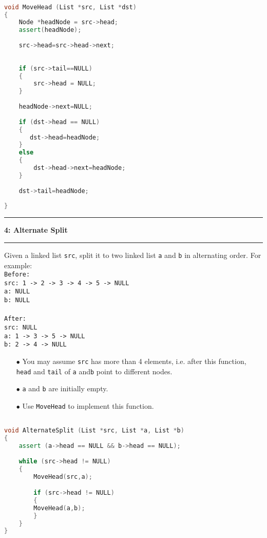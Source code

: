 \documentclass[10.5pt]{article}
\newcommand\question[2]{\vspace{.25in}\hrule\textbf{#1: #2}\vspace{.5em}\hrule\vspace{.10in}}
\begin{document}
\hrulefill
\begin{lstlisting}[language=C++]

void MoveHead (List *src, List *dst)
{
    Node *headNode = src->head;
    assert(headNode);
    
    src->head=src->head->next;
    
        
    if (src->tail==NULL)
    {
        src->head = NULL;
    }
    
    headNode->next=NULL;
    
    if (dst->head == NULL)
    {
       dst->head=headNode;
    }
    else
    {
        dst->head->next=headNode;
    }
    
    dst->tail=headNode;
    
}

\end{lstlisting}
\pagebreak

\question{4}{Alternate Split}
Given a linked list \texttt{src}, split it to two linked list  \texttt{a} and \texttt{b} in alternating order. For example:\\

\texttt{Before:}\\
\texttt{src: 1 -> 2 -> 3 -> 4 -> 5 -> NULL}\\
\texttt{a: NULL}\\
\texttt{b: NULL}\\
\\
\texttt{After:}\\
\texttt{src: NULL}\\
\texttt{a: 1 -> 3 -> 5 -> NULL}\\
\texttt{b: 2 -> 4 -> NULL}\\

\begin{enumerate}
	\item[$\bullet$] You may assume \texttt{src} has more than 4 elements, i.e. after this function, \texttt{head} and \texttt{tail} of \texttt{a} and\texttt{b} point to different nodes.
	\item[$\bullet$] \texttt{a} and \texttt{b} are initially empty.
	\item[$\bullet$] Use \texttt{MoveHead} to implement this function.
\end{enumerate}


\hrulefill
\begin{lstlisting}[language=C++]

void AlternateSplit (List *src, List *a, List *b)
{
    assert (a->head == NULL && b->head == NULL);
    
    while (src->head != NULL)
    {
        MoveHead(src,a);

     	if (src->head != NULL)
     	{
     	MoveHead(a,b);
     	}
    }
}

\end{lstlisting}
\pagebreak
\end{document}
